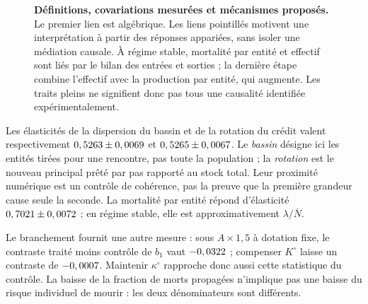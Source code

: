\begin{figure}[htbp]\centering
{}
\caption{\textbf{Définitions, covariations mesurées et mécanismes proposés.}
Le premier lien est algébrique. Les liens pointillés motivent une
interprétation à partir des réponses appariées, sans isoler une médiation
causale. À régime stable, mortalité par entité et effectif sont liés par
le bilan des entrées et sorties ; la dernière étape combine l'effectif
avec la production par entité, qui augmente. Les traits pleins ne signifient
donc pas tous une causalité identifiée expérimentalement.}
\label{fig:chaine}
\end{figure}

Les élasticités de la dispersion du bassin et de la rotation du crédit
valent respectivement $0,5263\pm0,0069$ et
$0,5265\pm0,0067$. Le \emph{bassin}
désigne ici les entités tirées pour une rencontre, pas toute la population ;
la \emph{rotation} est le nouveau principal prêté par pas rapporté au
stock total. Leur proximité numérique est un contrôle de cohérence,
pas la preuve que la première grandeur cause seule la seconde.
La mortalité par entité répond d'élasticité
$0,7021\pm0,0072$ ; en régime stable,
elle est approximativement $\lambda/\overline N$.

Le branchement fournit une autre mesure : sous $A\times1{,}5$ à dotation
fixe, le contraste traité moins contrôle de $b_1$ vaut $-0,0322$ ; compenser $K^\circ$ laisse
un contraste de $-0,0007$. Maintenir
$\kappa^\circ$ rapproche donc aussi cette statistique du contrôle.
La baisse de la fraction de morts propagées n'implique pas une baisse
du risque individuel de mourir : les deux dénominateurs sont différents.

